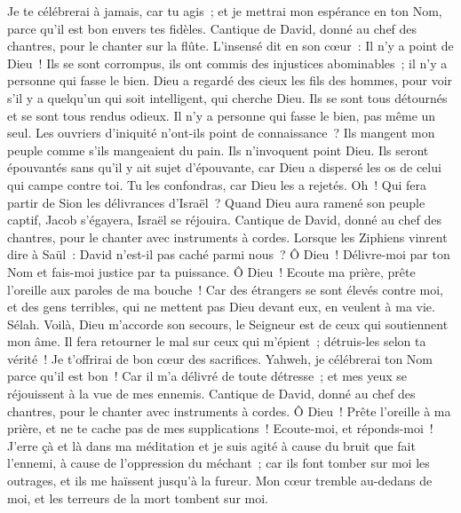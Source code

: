 \begin{multicols}{2}
Je te célébrerai à jamais, car tu agis~; et je mettrai mon espérance en ton Nom, parce qu'il est bon envers tes fidèles.
\VerseOne{}Cantique de David, donné au chef des chantres, pour le chanter sur la flûte.
L'insensé dit en son cœur~: Il n'y a point de Dieu~! Ils se sont corrompus, ils ont commis des injustices abominables~; il n'y a personne qui fasse le bien.
Dieu a regardé des cieux les fils des hommes, pour voir s'il y a quelqu'un qui soit intelligent, qui cherche Dieu.
Ils se sont tous détournés et se sont tous rendus odieux. Il n'y a personne qui fasse le bien, pas même un seul.
Les ouvriers d'iniquité n'ont-ils point de connaissance~? Ils mangent mon peuple comme s'ils mangeaient du pain. Ils n'invoquent point Dieu.
Ils seront épouvantés sans qu'il y ait sujet d'épouvante, car Dieu a dispersé les os de celui qui campe contre toi. Tu les confondras, car Dieu les a rejetés.
Oh~! Qui fera partir de Sion les délivrances d'Israël~? Quand Dieu aura ramené son peuple captif, Jacob s'égayera, Israël se réjouira.
\VerseOne{}Cantique de David, donné au chef des chantres, pour le chanter avec instruments à cordes.
Lorsque les Ziphiens vinrent dire à Saül~: David n'est-il pas caché parmi nous~?
Ô Dieu~! Délivre-moi par ton Nom et fais-moi justice par ta puissance.
Ô Dieu~! Ecoute ma prière, prête l'oreille aux paroles de ma bouche~!
Car des étrangers se sont élevés contre moi, et des gens terribles, qui ne mettent pas Dieu devant eux, en veulent à ma vie. Sélah.
Voilà, Dieu m'accorde son secours, le Seigneur est de ceux qui soutiennent mon âme.
Il fera retourner le mal sur ceux qui m'épient~; détruis-les selon ta vérité~!
Je t'offrirai de bon cœur des sacrifices. Yahweh, je célébrerai ton Nom parce qu'il est bon~!
Car il m'a délivré de toute détresse~; et mes yeux se réjouissent à la vue de mes ennemis.
\VerseOne{}Cantique de David, donné au chef des chantres, pour le chanter avec instruments à cordes.
Ô Dieu~! Prête l'oreille à ma prière, et ne te cache pas de mes supplications~!
Ecoute-moi, et réponds-moi~! J'erre çà et là dans ma méditation et je suis agité
à cause du bruit que fait l'ennemi, à cause de l'oppression du méchant~; car ils font tomber sur moi les outrages, et ils me haïssent jusqu'à la fureur.
Mon cœur tremble au-dedans de moi, et les terreurs de la mort tombent sur moi.

\end{multicols}
